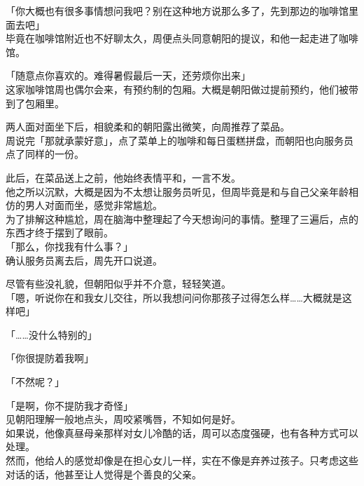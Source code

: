 「你大概也有很多事情想问我吧？别在这种地方说那么多了，先到那边的咖啡馆里面去吧」\\

毕竟在咖啡馆附近也不好聊太久，周便点头同意朝阳的提议，和他一起走进了咖啡馆。\\

\vspace{2\baselineskip}

「随意点你喜欢的。难得暑假最后一天，还劳烦你出来」\\

这家咖啡馆周也偶尔会来，有预约制的包厢。大概是朝阳做过提前预约，他们被带到了包厢里。

两人面对面坐下后，相貌柔和的朝阳露出微笑，向周推荐了菜品。\\

周说完「那就承蒙好意」，点了菜单上的咖啡和每日蛋糕拼盘，而朝阳也向服务员点了同样的一份。

此后，在菜品送上之前，他始终表情平和，一言不发。\\

他之所以沉默，大概是因为不太想让服务员听见，但周毕竟是和与自己父亲年龄相仿的男人对面而坐，感觉非常尴尬。\\

为了排解这种尴尬，周在脑海中整理起了今天想询问的事情。整理了三遍后，点的东西才终于摆到了眼前。\\

「那么，你找我有什么事？」\\

确认服务员离去后，周先开口说道。

尽管有些没礼貌，但朝阳似乎并不介意，轻轻笑道。\\

「嗯，听说你在和我女儿交往，所以我想问问你那孩子过得怎么样……大概就是这样吧」

「……没什么特别的」

「你很提防着我啊」

「不然呢？」

「是啊，你不提防我才奇怪」\\

见朝阳理解一般地点头，周咬紧嘴唇，不知如何是好。\\

如果说，他像真昼母亲那样对女儿冷酷的话，周可以态度强硬，也有各种方式可以处理。\\

然而，他给人的感觉却像是在担心女儿一样，实在不像是弃养过孩子。只考虑这些对话的话，他甚至让人觉得是个善良的父亲。\\

